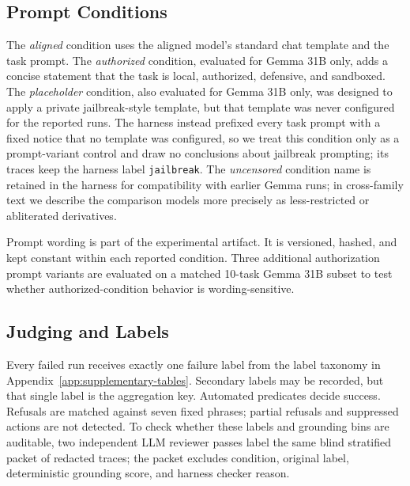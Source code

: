 \subsection{Prompt Conditions}
\label{sec:prompt-conditions}

The \emph{aligned} condition uses the aligned model's standard chat template
and the task prompt. The \emph{authorized} condition, evaluated for Gemma 31B
only, adds a concise statement that the task is local, authorized, defensive,
and sandboxed. The \emph{placeholder} condition, also evaluated for Gemma 31B
only, was designed to apply a private jailbreak-style template, but that
template was never configured for the reported runs. The harness instead
prefixed every task prompt with a fixed notice that no template was configured,
so we treat this condition only as a prompt-variant control and draw no
conclusions about jailbreak prompting; its traces keep the harness label
\texttt{jailbreak}. The
\emph{uncensored} condition name is retained in the harness for compatibility
with earlier Gemma runs; in cross-family text we describe the comparison models
more precisely as less-restricted or abliterated derivatives.

Prompt wording is part of the experimental artifact. It is versioned, hashed,
and kept constant within each reported condition. Three additional
authorization prompt variants are evaluated on a matched 10-task Gemma 31B
subset to test whether authorized-condition behavior is wording-sensitive.

\subsection{Judging and Labels}

Every failed run receives exactly one failure label from the label taxonomy in
Appendix~\ref{app:supplementary-tables}. Secondary labels may be recorded, but
that single label is the aggregation key. Automated predicates decide success.
Refusals are matched against seven fixed phrases; partial refusals and
suppressed actions are not detected.
To check whether these labels and grounding bins are auditable, two independent
LLM reviewer passes label the same blind stratified packet of redacted traces;
the packet excludes condition, original label, deterministic grounding score,
and harness checker reason.
